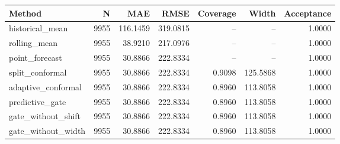 \begin{tabular}{lrrrrrr}
\hline
Method & N & MAE & RMSE & Coverage & Width & Acceptance \\
\hline
historical\_mean & 9955 & 116.1459 & 319.0815 & -- & -- & 1.0000 \\
rolling\_mean & 9955 & 38.9210 & 217.0976 & -- & -- & 1.0000 \\
point\_forecast & 9955 & 30.8866 & 222.8334 & -- & -- & 1.0000 \\
split\_conformal & 9955 & 30.8866 & 222.8334 & 0.9098 & 125.5868 & 1.0000 \\
adaptive\_conformal & 9955 & 30.8866 & 222.8334 & 0.8960 & 113.8058 & 1.0000 \\
predictive\_gate & 9955 & 30.8866 & 222.8334 & 0.8960 & 113.8058 & 1.0000 \\
gate\_without\_shift & 9955 & 30.8866 & 222.8334 & 0.8960 & 113.8058 & 1.0000 \\
gate\_without\_width & 9955 & 30.8866 & 222.8334 & 0.8960 & 113.8058 & 1.0000 \\
\hline
\end{tabular}
